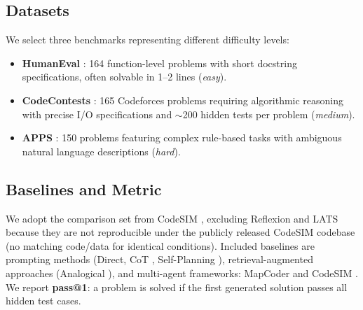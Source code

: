 \documentclass[11pt]{article}
\begin{document}
\subsection{Datasets}
We select three benchmarks representing different difficulty levels:
\begin{itemize}[leftmargin=*, itemsep=2pt, topsep=2pt]
    \item \textbf{HumanEval} \citep{chen2021evaluating}: 164 function-level problems with short docstring specifications, often solvable in 1--2 lines (\textit{easy}).
    \item \textbf{CodeContests} \citep{li2022competition}: 165 Codeforces problems requiring algorithmic reasoning with precise I/O specifications and ${\sim}$200 hidden tests per problem (\textit{medium}).
    \item \textbf{APPS} \citep{hendrycks2021measuring}: 150 problems featuring complex rule-based tasks with ambiguous natural language descriptions (\textit{hard}).
\end{itemize}

\subsection{Baselines and Metric}
We adopt the comparison set from CodeSIM \citep{islam2025codesim}, excluding Reflexion \citep{shinn2023reflexion} and LATS \citep{zhou2023language} because they are not reproducible under the publicly released CodeSIM codebase (no matching code/data for identical conditions). Included baselines are prompting methods (Direct, CoT \citep{wei2022chain}, Self-Planning \citep{jiang2023self}), retrieval-augmented approaches (Analogical \citep{yasunaga2023large}), and multi-agent frameworks: MapCoder \citep{islam2024mapcoder} and CodeSIM \citep{islam2025codesim}. We report \textbf{pass@1}: a problem is solved if the first generated solution passes all hidden test cases.
\end{document}

